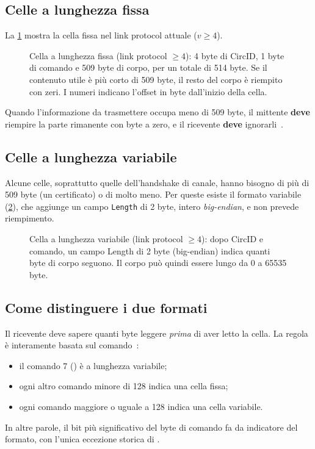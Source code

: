 \subsection{Celle a lunghezza fissa}

La \cref{fig:cella-fissa} mostra la cella fissa nel link protocol attuale ($v\ge4$).

\begin{figure}[htbp]
\centering

\caption{Cella a lunghezza fissa (link protocol $\ge 4$): 4 byte di CircID, 1 byte di comando e 509 byte di corpo, per un totale di 514 byte. Se il contenuto utile è più corto di 509 byte, il resto del corpo è riempito con zeri. I numeri indicano l'offset in byte dall'inizio della cella.}
\label{fig:cella-fissa}
\end{figure}

Quando l'informazione da trasmettere occupa meno di 509 byte, il mittente \textbf{deve} riempire la parte rimanente con byte a zero, e il ricevente \textbf{deve} ignorarli~.

\subsection{Celle a lunghezza variabile}

Alcune celle, soprattutto quelle dell'handshake di canale, hanno bisogno di più di 509 byte (un certificato) o di molto meno. Per queste esiste il formato variabile (\cref{fig:cella-variabile}), che aggiunge un campo \texttt{Length} di 2 byte, intero \emph{big-endian}, e non prevede riempimento.

\begin{figure}[htbp]
\centering

\caption{Cella a lunghezza variabile (link protocol $\ge 4$): dopo CircID e comando, un campo Length di 2 byte (big-endian) indica quanti byte di corpo seguono. Il corpo può quindi essere lungo da 0 a \num{65535} byte.}
\label{fig:cella-variabile}
\end{figure}

\subsection{Come distinguere i due formati}

Il ricevente deve sapere quanti byte leggere \emph{prima} di aver letto la cella. La regola è interamente basata sul comando~:
\begin{itemize}
  \item il comando 7 () è a lunghezza variabile;
  \item ogni altro comando minore di 128 indica una cella fissa;
  \item ogni comando maggiore o uguale a 128 indica una cella variabile.
\end{itemize}
In altre parole, il bit più significativo del byte di comando fa da indicatore del formato, con l'unica eccezione storica di .

